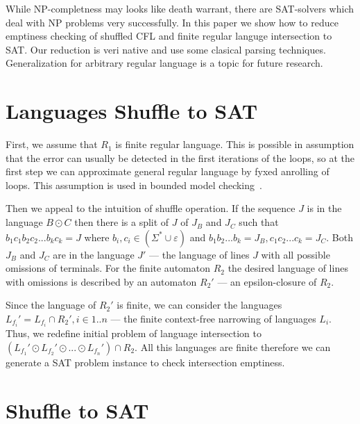 While NP-completness may looks like death warrant, there are SAT-solvers which deal with NP problems very successfully.
In this paper we show how to reduce emptiness checking of shuffled CFL and finite regular languge intersection to SAT.
Our reduction is veri native and use some clasical parsing techniques.
Generalization for arbitrary regular language is a topic for future research.


\section{Languages Shuffle to SAT}

First, we assume that $ R_1 $ is finite regular language.
This is possible in assumption that the error can usually be detected in the first iterations of the loops, so at the first step we can approximate general regular language by fyxed anrolling of loops.
This assumption is used in bounded model checking~\cite{BMC}.%

Then we appeal to the intuition of shuffle operation.
If the sequence $J$ is in the language $B \odot C$ then there is a split of $J$ of $J_B$ and $J_C$ such that $b_1 c_1 b_2 c_2 ... b_k c_k = J$ where $b_i, c_i \in (\Sigma^* \cup \varepsilon)$
and $b_1 b_2 ... b_k = J_B, c_1 c_2 ... c_k = J_C$.
Both $J_B$ and $J_C$ are in the language $J'$ --- the language of lines $J$ with all possible omissions of terminals.
For the finite automaton $R_2$ the desired language of lines with omissions is described by an automaton $R_2'$ --- an epsilon-closure of $ R_2 $.

Since the language of $R_2'$ is finite, we can consider the languages
$ L_{f_i}' = L_{f_i} \cap R_2', i \in 1..n$ --- the finite context-free narrowing of languages $ L_{i}$.
Thus, we redefine initial problem of language intersection to $(L_{f_1}' \odot L_{f_2}' \odot... \odot L_{f_n}')\cap R_2$.
All this languages are finite therefore we can generate a SAT problem instance to check intersection emptiness.

\section{Shuffle to SAT}

